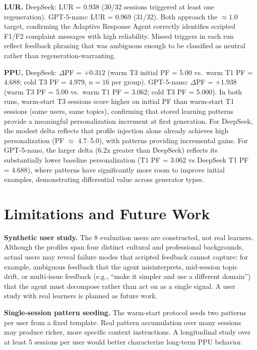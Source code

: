 \documentclass[conference]{IEEEtran}
\begin{document}
\textbf{LUR.} DeepSeek: LUR = 0.938 (30/32 sessions triggered at least one regeneration). GPT-5-nano: LUR = 0.969 (31/32). Both approach the $\approx 1.0$ target, confirming the Adaptive Response Agent correctly identifies scripted F1/F2 complaint messages with high reliability. Missed triggers in each run reflect feedback phrasing that was ambiguous enough to be classified as neutral rather than regeneration-warranting.

\textbf{PPU.} DeepSeek: $\Delta$PF = $+0.312$ (warm T3 initial PF = 5.00 vs.\ warm T1 PF = 4.688; cold T3 PF = 4.979, $n = 16$ per group). GPT-5-nano: $\Delta$PF = $+1.938$ (warm T3 PF = 5.00 vs.\ warm T1 PF = 3.062; cold T3 PF = 5.000). In both runs, warm-start T3 sessions score higher on initial PF than warm-start T1 sessions (same users, same topics), confirming that stored learning patterns provide a meaningful personalization increment at first generation. For DeepSeek, the modest delta reflects that profile injection alone already achieves high personalization (PF $\approx$ 4.7--5.0), with patterns providing incremental gains. For GPT-5-nano, the larger delta (6.2x greater than DeepSeek) reflects its substantially lower baseline personalization (T1 PF = 3.062 vs DeepSeek T1 PF = 4.688), where patterns have significantly more room to improve initial examples, demonstrating differential value across generator types.


\section{Limitations and Future Work}

\textbf{Synthetic user study.} The 8 evaluation users are constructed, not real learners. Although the profiles span four distinct cultural and professional backgrounds, actual users may reveal failure modes that scripted feedback cannot capture: for example, ambiguous feedback that the agent misinterprets, mid-session topic drift, or multi-issue feedback (e.g., ``make it simpler and use a different domain'') that the agent must decompose rather than act on as a single signal. A user study with real learners is planned as future work.

\textbf{Single-session pattern seeding.} The warm-start protocol seeds two patterns per user from a fixed template. Real pattern accumulation over many sessions may produce richer, more specific context instructions. A longitudinal study over at least 5 sessions per user would better characterize long-term PPU behavior.
\end{document}
